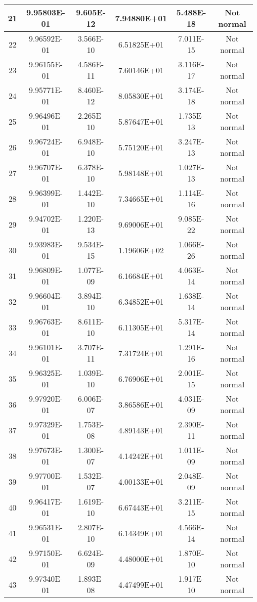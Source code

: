 \begin{table}[h]
\begin{tabular}{|c|c|c|c|c|c|}
		21 & 9.95803E-01 & 9.605E-12 & 7.94880E+01 & 5.488E-18 & Not normal\\\hline
		22 & 9.96592E-01 & 3.566E-10 & 6.51825E+01 & 7.011E-15 & Not normal\\\hline
		23 & 9.96155E-01 & 4.586E-11 & 7.60146E+01 & 3.116E-17 & Not normal\\\hline
		24 & 9.95771E-01 & 8.460E-12 & 8.05830E+01 & 3.174E-18 & Not normal\\\hline
		25 & 9.96496E-01 & 2.265E-10 & 5.87647E+01 & 1.735E-13 & Not normal\\\hline
		26 & 9.96724E-01 & 6.948E-10 & 5.75120E+01 & 3.247E-13 & Not normal\\\hline
		27 & 9.96707E-01 & 6.378E-10 & 5.98148E+01 & 1.027E-13 & Not normal\\\hline
		28 & 9.96399E-01 & 1.442E-10 & 7.34665E+01 & 1.114E-16 & Not normal\\\hline
		29 & 9.94702E-01 & 1.220E-13 & 9.69006E+01 & 9.085E-22 & Not normal\\\hline
		30 & 9.93983E-01 & 9.534E-15 & 1.19606E+02 & 1.066E-26 & Not normal\\\hline
		31 & 9.96809E-01 & 1.077E-09 & 6.16684E+01 & 4.063E-14 & Not normal\\\hline
		32 & 9.96604E-01 & 3.894E-10 & 6.34852E+01 & 1.638E-14 & Not normal\\\hline
		33 & 9.96763E-01 & 8.611E-10 & 6.11305E+01 & 5.317E-14 & Not normal\\\hline
		34 & 9.96101E-01 & 3.707E-11 & 7.31724E+01 & 1.291E-16 & Not normal\\\hline
		35 & 9.96325E-01 & 1.039E-10 & 6.76906E+01 & 2.001E-15 & Not normal\\\hline
		36 & 9.97920E-01 & 6.006E-07 & 3.86586E+01 & 4.031E-09 & Not normal\\\hline
		37 & 9.97329E-01 & 1.753E-08 & 4.89143E+01 & 2.390E-11 & Not normal\\\hline
		38 & 9.97673E-01 & 1.300E-07 & 4.14242E+01 & 1.011E-09 & Not normal\\\hline
		39 & 9.97700E-01 & 1.532E-07 & 4.00133E+01 & 2.048E-09 & Not normal\\\hline
		40 & 9.96417E-01 & 1.619E-10 & 6.67443E+01 & 3.211E-15 & Not normal\\\hline
		41 & 9.96531E-01 & 2.807E-10 & 6.14349E+01 & 4.566E-14 & Not normal\\\hline
		42 & 9.97150E-01 & 6.624E-09 & 4.48000E+01 & 1.870E-10 & Not normal\\\hline
		43 & 9.97340E-01 & 1.893E-08 & 4.47499E+01 & 1.917E-10 & Not normal\\\hline

\end{tabular}
\end{table}
